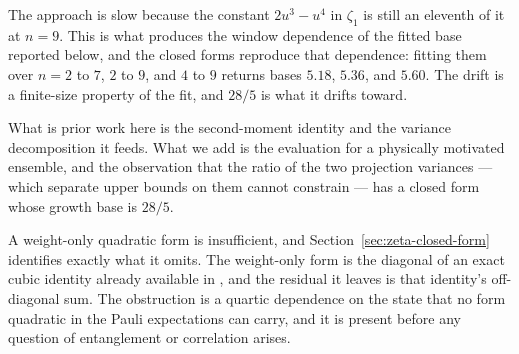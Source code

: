 The approach is slow because the constant \(2u^3 - u^4\) in \(\zeta_1\) is
still an eleventh of it at \(n=9\). This is what produces the window
dependence of the fitted base reported below, and the closed forms
reproduce that dependence: fitting them over \(n = 2\) to \(7\), \(2\) to
\(9\), and \(4\) to \(9\) returns bases \(5.18\), \(5.36\), and \(5.60\).
The drift is a finite-size property of the fit, and \(28/5\) is what it
drifts toward.

What is prior work here is the second-moment identity and the variance
decomposition it feeds. What we add is the evaluation for a physically
motivated ensemble, and the observation that the ratio of the two
projection variances — which separate upper bounds on them cannot
constrain — has a closed form whose growth base is \(28/5\).



A weight-only quadratic form is insufficient, and
Section~\ref{sec:zeta-closed-form} identifies exactly what it omits. The
weight-only form is the diagonal of an exact cubic identity already
available in \cite{huang2020shadows}, and the residual it leaves is that
identity's off-diagonal sum. The obstruction is a quartic dependence on
the state that no form quadratic in the Pauli expectations can carry, and
it is present before any question of entanglement or correlation arises.




